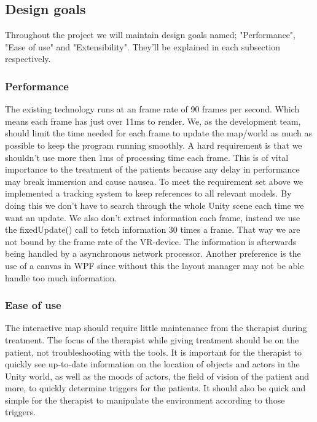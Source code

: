 \documentclass[11pt]{article}
\begin{document}
    \subsection{Design goals}
    Throughout the project we will maintain design goals named; "Performance", "Ease of use" and "Extensibility". They'll be explained in each subsection respectively.

        \subsubsection{Performance}
        The existing technology runs at an frame rate of 90 frames per second. Which means each frame has just over 11ms to render. We, as the development team, should limit the time needed for each frame to update the map/world as much as possible to keep the program running smoothly. A hard requirement is that we shouldn't use more then 1ms of processing time each frame. This is of vital importance to the treatment of the patients because any delay in performance may break immersion and cause nausea.
        \newline
        \newline
        To meet the requirement set above we implemented a tracking system to keep references to all relevant models. By doing this we don't have to search through the whole Unity scene each time we want an update. We also don't extract information each frame, instead we use the fixedUpdate() call to fetch information 30 times a frame. That way we are not bound by the frame rate of the VR-device. The information is afterwards being handled by a asynchronous network processor. Another preference is the use of a canvas in WPF since without this the layout manager may not be able handle too much information.
        

        \subsubsection{Ease of use }
        The interactive map should require little maintenance from the therapist during treatment. The focus of the therapist while giving treatment should be on the patient, not troubleshooting with the tools. It is important for the therapist to quickly see up-to-date information on the location of objects and actors in the \gls{Unity} world, as well as the moods of actors, the field of vision of the patient and more, to quickly determine triggers for the patients. It should also be quick and simple for the therapist to manipulate the environment according to those triggers.
            
\end{document}

